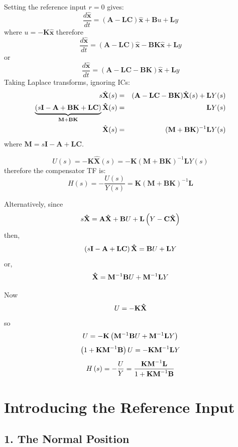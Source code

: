 Setting the reference input $r = 0$  gives:
\[
\frac{d\hat{\mathbf{x}}}{dt}=(\mathbf{A}-\mathbf{LC})\hat{\mathbf{x}}+ \mathbf{B}u+\mathbf{L}y
\]
where $u=-\mathbf{K}\hat{\mathbf{x}}$ therefore
\[
\frac{d\hat{\mathbf{x}}}{dt}=(\mathbf{A}-\mathbf{LC})\hat{\mathbf{x}} - \mathbf{BK}\hat{\mathbf{x}}+\mathbf{L}y
\]
or
\[
\frac{d\hat{\mathbf{x}}}{dt}=(\mathbf{A} - \mathbf{LC} - \mathbf{BK})\hat{\mathbf{x}} + \mathbf{L}y
\]
Taking Laplace transforms, ignoring ICs:
\begin{eqnarray*}
s\hat{\mathbf{X}}(s) & = & (\mathbf{A} - \mathbf{LC} - \mathbf{BK})\hat{\mathbf{X}}(s) + \mathbf{L}Y(s) \\	
\underbrace {(s{\bf{I}} - {\bf{A}} + {\bf{BK}} + {\bf{LC}})}_{{\bf{M + BK}}}{\bf{\hat X}}(s) & = & {\bf{L}}Y(s) \\
\hat{\mathbf{X}}(s) & = & (\mathbf{M}+\mathbf{BK})^{-1}{\bf{L}}Y(s)
\end{eqnarray*}
where $\mathbf{M}=s\mathbf{I}-\mathbf{A}+\mathbf{LC}$.
 
\[
U(s)=-\mathbf{K}\hat{\mathbf{X}}(s)=-\mathbf{K}(\mathbf{M}+\mathbf{BK})^{-1}\mathbf{L}Y(s)
\]
therefore the compensator TF is:
\[
H(s)=-\frac{U(s)}{Y(s)}=\mathbf{K}(\mathbf{M}+\mathbf{BK})^{-1}\mathbf{L}
\]


Alternatively, since
\[
s{\bf{\hat X}} =  {\bf{A\hat X}} + {\bf{B}}U + {\bf{L}}\left( {Y - {\bf{C\hat X}}} \right)
\]
then,
\[
\left( {s{\bf{I}} - {\bf{A}} + {\bf{LC}}} \right){\bf{\hat X}} = {\bf{B}}U + {\bf{L}}Y 
\]
or,
\[
{\bf{\hat X}} = {\bf{M}}^{ - 1} {\bf{B}}U + {\bf{M}}^{ - 1} {\bf{L}}Y
\]

Now
\[
U =  - {\bf{K\hat X}} 
\]
so
\[
U  =   - {\bf{K}}\left( {{\bf{M}}^{ - 1} {\bf{B}}U + {\bf{M}}^{ - 1} {\bf{L}}Y} \right) 
\]
\[
 \left( {1 + {\bf{KM}}^{ - 1} {\bf{B}}} \right)U =  - {\bf{KM}}^{ - 1} {\bf{L}}Y
\]
\[ 
 H\left( s \right) =  - \frac{U}{Y} = \frac{{{\bf{KM}}^{ - 1} {\bf{L}}}}{{1 + {\bf{KM}}^{ - 1} {\bf{B}}}} 
\]




 
\section*{Introducing the Reference Input} %
\label{sec:introducing_the_reference_input}

\subsection*{1. The Normal Position} %
\label{sub:1_the_normal_position}

